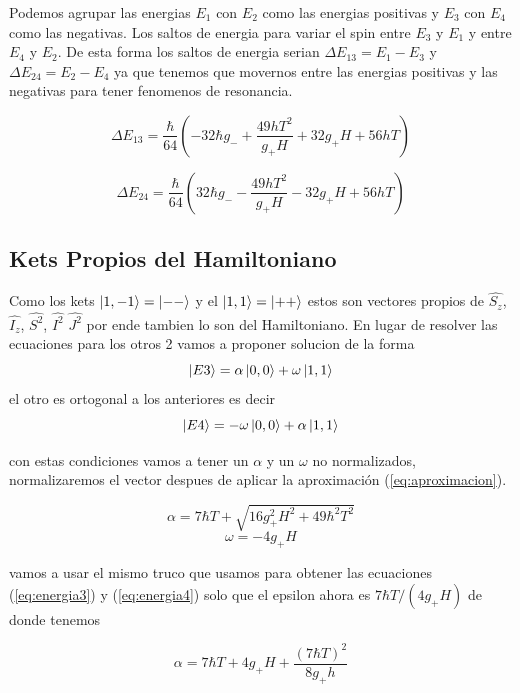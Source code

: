 \documentclass[twocolumn,
amssymb,prb,aps,superscriptaddress]{revtex4}
\begin{document}
    Podemos agrupar las energias $E_1$ con $E_2$ como las energias positivas y $E_3$ con $E_4$ como las negativas. Los saltos de energia para variar el spin entre $E_3$ y $E_1$ y entre $E_4$ y $E_2$. De esta forma los saltos de energia serian $\Delta E_{13} = E_1 - E_3$ y $\Delta E_{24} = E_2 - E_4$ ya que tenemos que movernos entre las energias positivas y las negativas para tener fenomenos de resonancia.

    \begin{equation}
        \Delta E_{13} = \frac{\hbar}{64} \left(-32 \hbar g_- +\frac{49 h T^2}{g_+ H}+32 g_+ H+56 h T\right)
    \end{equation}

    \begin{equation}
        \Delta E_{24} = \frac{\hbar}{64} \left(32 \hbar g_- -\frac{49 h T^2}{g_+ H}-32 g_+ H+56 h T\right)
    \end{equation}

    \subsection{Kets Propios del Hamiltoniano}

    Como los kets $\ket{1,-1} = \ket{--}$ y el $\ket{1,1} = \ket{++}$ estos son vectores propios de $\hat{S_z}$, $ \hat{I_z}$, $ \hat{S^2}$, $ \hat{I^2}$ $ \hat{J^2}$ por ende tambien lo son del Hamiltoniano. En lugar de resolver las ecuaciones para los otros 2 vamos a proponer solucion de la forma 
    $$ \ket{E3} = \alpha \ket{0,0} + \omega \ket{1,1} $$ 
    el otro es ortogonal a los anteriores es decir 
    $$ \ket{E4} = -\omega \ket{0,0} + \alpha \ket{1,1} $$

    con estas condiciones vamos a tener un $\alpha$ y un $\omega$ no normalizados, normalizaremos el vector despues de aplicar la aproximación (\ref{eq:aproximacion}).

    \begin{equation}
        \alpha = 7 \hbar T+\sqrt{16 g_+^2 H^2+49 \hbar^2 T^2}
    \end{equation}
    \begin{equation}
        \omega = -4g_+ H
    \end{equation}
    
    vamos a usar el mismo truco que usamos para obtener las ecuaciones (\ref{eq:energia3}) y (\ref{eq:energia4}) solo que el epsilon ahora es $ 7 \hbar T / (4 g_+ H) $ de donde tenemos 

    \begin{equation*}
       \alpha = 7 \hbar T + 4 g_+ H + \frac{(7 \hbar T)^2}{8 g_+ h}
    \end{equation*}
\end{document}
